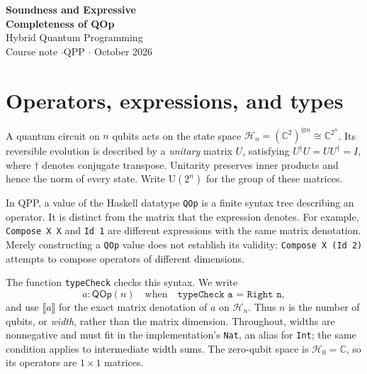 \documentclass[11pt,a4paper]{article}
\newcommand{\C}{\mathbb C}
\newcommand{\U}{\mathrm U}
\newcommand{\sem}[1]{\llbracket #1\rrbracket}
\newcommand{\code}[1]{\texttt{#1}}
\newcommand{\checked}[2]{#1\mathbin{:}\mathsf{QOp}(#2)}
\begin{document}
\begin{center}
{\LARGE\bfseries Soundness and Expressive\\[3pt] Completeness of QOp}\\[8pt]
{\large Hybrid Quantum Programming}\\[7pt]
{\small Course note \quad$\cdot$\quad QPP \quad$\cdot$ October 2026}
\end{center}

\begin{abstract}
\noindent QOp is the language of unitary operators used in QPP. Its type
checker verifies dimensions and proves the Hermiticity conditions needed
for rotations, without constructing operator matrices. This note develops
the connection between these checks and the mathematical semantics of
quantum circuits. Accepted expressions denote unitary operators. With
real angle parameters the language can express every qubit unitary;
with its implemented rational parameters it can approximate every such
unitary arbitrarily closely. The proofs distinguish the expressive power
of the language from the ability of the checker to recognize valid
expressions.
\end{abstract}

\section{Operators, expressions, and types}

A quantum circuit on $n$ qubits acts on the state space
$\mathcal H_n=(\C^2)^{\otimes n}\cong\C^{2^n}$. Its reversible
evolution is described by a \emph{unitary} matrix $U$, satisfying
$U^\dagger U=UU^\dagger=I$, where $\dagger$ denotes conjugate transpose.
Unitarity preserves inner products and hence the norm of every state.
Write $\U(2^n)$ for the group of these matrices.

In QPP, a value of the Haskell datatype \code{QOp} is a finite syntax
tree describing an operator. It is distinct from the matrix that the
expression denotes. For example, \code{Compose X X} and \code{Id 1}
are different expressions with the same matrix denotation. Merely
constructing a \code{QOp} value does not establish its validity:
\code{Compose X (Id 2)} attempts to compose operators of different
dimensions.

The function \code{typeCheck} checks this syntax. We write
\[
  \checked a n
  \quad\text{when}\quad
  \code{typeCheck a = Right n},
\]
and use $\sem a$ for the exact matrix denotation of $a$ on $\mathcal H_n$.
Thus $n$ is the number of qubits, or \emph{width}, rather than the matrix
dimension. Throughout, widths are nonnegative and must fit in the
implementation's \code{Nat}, an alias for \code{Int}; the same condition
applies to intermediate width sums. The zero-qubit space is
$\mathcal H_0=\C$, so its operators are $1\times1$ matrices.
\end{document}
